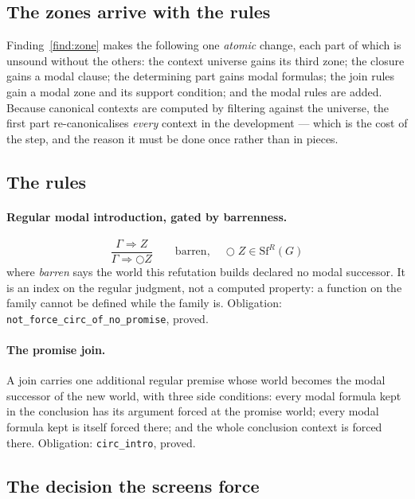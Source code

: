 \documentclass[11pt,a4paper]{article}
\begin{document}
\subsection{The zones arrive with the rules}
\label{sec:zones}

Finding~\ref{find:zone} makes the following one \emph{atomic} change, each
part of which is unsound without the others: the context universe gains
its third zone; the closure gains a modal clause; the determining part
gains modal formulas; the join rules gain a modal zone and its support
condition; and the modal rules are added. Because canonical contexts are
computed by filtering against the universe, the first part
re-canonicalises \emph{every} context in the development --- which is the
cost of the step, and the reason it must be done once rather than in
pieces.

\subsection{The rules}

\paragraph{Regular modal introduction, gated by barrenness.}
\[
\frac{\Gamma \Rightarrow Z}{\Gamma \Rightarrow \bigcirc Z}
\qquad \text{barren},\quad \bigcirc Z \in \mathrm{Sf}^{R}(G)
\]
where \emph{barren} says the world this refutation builds declared no
modal successor. It is an index on the regular judgment, not a computed
property: a function on the family cannot be defined while the family is.
Obligation: \texttt{not\_force\_circ\_of\_no\_promise}, proved.

\paragraph{The promise join.} A join carries one additional regular
premise whose world becomes the modal successor of the new world, with
three side conditions: every modal formula kept in the conclusion has its
argument forced at the promise world; every modal formula kept is itself
forced there; and the whole conclusion context is forced there.
Obligation: \texttt{circ\_intro}, proved.

\subsection{The decision the screens force}
\label{sec:decision}
\end{document}
